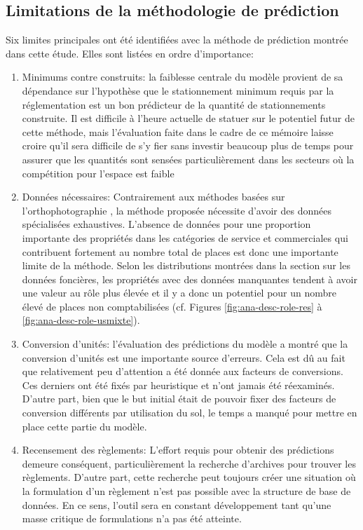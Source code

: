     \subsection{Limitations de la méthodologie de prédiction}
        Six limites principales ont été identifiées avec la méthode de prédiction montrée dans cette étude. Elles sont listées en ordre d'importance:
        \begin{enumerate}
            \item Minimums  contre construits: la faiblesse centrale du modèle provient de sa dépendance sur l'hypothèse que le stationnement minimum requis par la réglementation est un bon prédicteur de la quantité de stationnements construite. Il est difficile à l'heure actuelle de statuer sur le potentiel futur de cette méthode, mais l'évaluation faite dans le cadre de ce mémoire laisse croire qu'il sera difficile de s'y fier sans investir beaucoup plus de temps pour assurer que les quantités sont sensées particulièrement dans les secteurs où la compétition pour l'espace est faible \parencite{li_parking_2014}
            \item Données nécessaires: Contrairement aux méthodes basées sur l'orthophotographie \parencite{hellekes_parking_2023,qiam_pipeline_2025}, la méthode proposée nécessite d'avoir des données spécialisées exhaustives. L'absence de données pour une proportion importante des propriétés dans les catégories de service et commerciales qui contribuent fortement au nombre total de places est donc une importante limite de la méthode. Selon les distributions montrées dans la section sur les données foncières, les propriétés avec des données manquantes tendent à avoir une valeur au rôle plus élevée et il y a donc un potentiel pour un nombre élevé de places non comptabilisées (cf. Figures \ref{fig:ana-desc-role-res} à \ref{fig:ana-desc-role-usmixte}). 
            \item Conversion d'unités: l'évaluation des prédictions du modèle a montré que la conversion d'unités est une importante source d'erreurs. Cela est dû au fait que relativement peu d'attention a été donnée aux facteurs de conversions. Ces derniers ont été fixés par heuristique et n'ont jamais été réexaminés. D'autre part, bien que le but initial était de pouvoir fixer des facteurs de conversion différents par utilisation du sol, le temps a manqué pour mettre en place cette partie du modèle.
            \item  Recensement des règlements: L'effort requis pour obtenir des prédictions demeure conséquent, particulièrement la recherche d'archives pour trouver les règlements. D'autre part, cette recherche peut toujours créer une situation où la formulation d'un règlement n'est pas possible avec la structure de base de données. En ce sens, l'outil sera en constant développement tant qu'une masse critique de formulations n'a pas été atteinte.

\end{enumerate}
